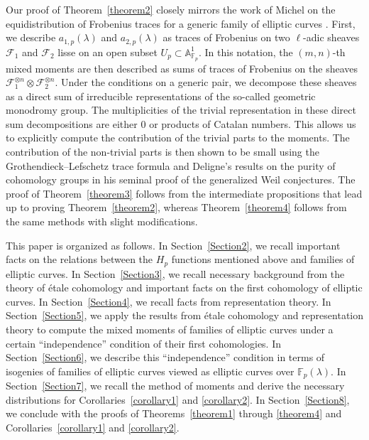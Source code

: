 \documentclass[12pt]{amsart}
\theoremstyle{definition}
\theoremstyle{remark}
\numberwithin{equation}{section}
\def\A{\mathbb A}
\def\F{{\mathbb F}}
\def\F{\mathbb{F}}
\begin{document}
Our proof of Theorem~\ref{theorem2} closely mirrors the work of Michel on the equidistribution of Frobenius traces for a generic family of elliptic curves \cite[Proposition 1.1]{RangMoyen}. First, we describe $a_{1,p}(\lambda)$ and $a_{2,p}(\lambda)$ as traces of Frobenius on two $\ell$-adic sheaves $\mathcal{F}_1$ and $\mathcal{F}_2$ lisse on an open subset $U_p\subset\A_{\F_p}^1.$ In this notation, the $(m,n)$-th mixed moments are then described as sums of traces of Frobenius on the sheaves $\mathcal{F}_1^{\otimes n}\otimes\mathcal{F}_2^{\otimes n}.$ Under the conditions on a generic pair, we decompose these sheaves as a direct sum of irreducible representations of the so-called geometric monodromy group. The multiplicities of the trivial representation in these direct sum decompositions are either $0$ or products of Catalan numbers. This allows us to explicitly compute the contribution of the trivial parts to the moments.  The contribution of the non-trivial parts is then shown to be small using the Grothendieck--Lefschetz trace formula and Deligne's \cite{WeilII} results on the purity of cohomology groups in his seminal proof of the generalized Weil conjectures. The proof of Theorem~\ref{theorem3} follows from the intermediate propositions that lead up to proving Theorem~\ref{theorem2}, whereas Theorem~\ref{theorem4} follows from the same methods with slight modifications.

This paper is organized as follows. In Section~\ref{Section2}, we recall important facts on the relations between the $H_p$ functions mentioned above and families of elliptic curves. In Section~\ref{Section3}, we recall necessary background from the theory of \'etale cohomology and important facts on the first cohomology of elliptic curves. In Section~\ref{Section4}, we recall facts from representation theory. In Section~\ref{Section5}, we apply the results from \'etale cohomology and representation theory to compute the mixed moments of families of elliptic curves under a certain ``independence'' condition of their first cohomologies. In Section~\ref{Section6}, we describe this ``independence'' condition in terms of isogenies of families of elliptic curves viewed as elliptic curves over $\F_p(\lambda).$ In Section~\ref{Section7}, we recall the method of moments and derive the necessary distributions for Corollaries~\ref{corollary1} and \ref{corollary2}. In Section~\ref{Section8}, we conclude with the proofs of Theorems~\ref{theorem1} through \ref{theorem4} and Corollaries~\ref{corollary1} and \ref{corollary2}.
\end{document}
